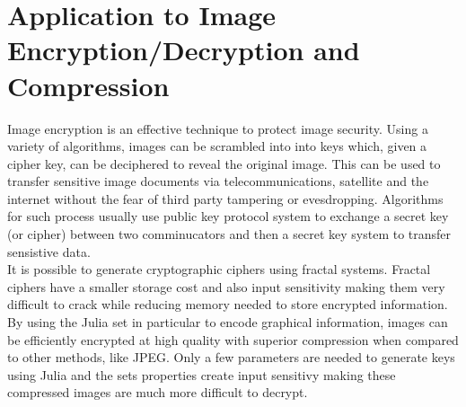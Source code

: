 \documentclass[12pt]{article}
\begin{document}
\section{Application to Image  Encryption/Decryption and Compression}
{\parindent0pt
Image encryption is an effective technique to protect image security. Using a variety of algorithms, images can be scrambled into into keys which, given a cipher key, can be deciphered to reveal the original image. This can be used to transfer sensitive image documents via telecommunications, satellite and the internet without the fear of third party tampering or evesdropping. Algorithms for such process usually use public key protocol system  to exchange a secret key (or cipher) between two comminucators and then a secret key system to transfer sensistive data. \cite{moham} \\

It is possible to generate cryptographic ciphers using fractal systems. Fractal ciphers have a smaller storage cost and also input sensitivity \cite{china} making them very difficult to crack while reducing memory needed to store encrypted information. By using the Julia set in particular to encode graphical information,  images can be efficiently encrypted at high quality with superior compression when compared to other methods, like JPEG.\cite{cotty} Only a few parameters are needed to generate keys  using Julia \cite{algo} and the sets properties create input sensitivy making these compressed images are much more difficult to decrypt. \cite{china}
}
\end{document}
